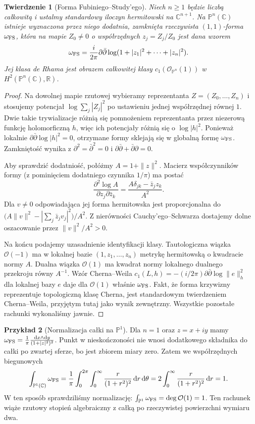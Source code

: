 \documentclass[11pt,a4paper,openany]{report}
\numberwithin{equation}{section}
\theoremstyle{plain}
\newtheorem{twierdzenie}{Twierdzenie}[section]
\theoremstyle{definition}
\newtheorem{przyklad}[twierdzenie]{Przykład}
\theoremstyle{remark}
\newcommand{\R}{\mathbb R}
\newcommand{\C}{\mathbb C}
\newcommand{\PP}{\mathbb P}
\begin{document}
\begin{twierdzenie}[Forma Fubiniego--Study'ego]
\label{tw:ga9-fs}
Niech $n\ge1$ będzie liczbą całkowitą i ustalmy standardowy iloczyn
hermitowski na $\C^{n+1}$. Na $\PP^n(\C)$ istnieje
wyznaczona przez niego dodatnia,
zamknięta rzeczywista $(1,1)$-forma
$\omega_{\rm FS}$, która na mapie $Z_0\ne0$
o współrzędnych $z_j=Z_j/Z_0$ jest dana wzorem
\[
 \omega_{\rm FS}=\frac{i}{2\pi}\partial\bar\partial
 \log(1+|z_1|^2+\cdots+|z_n|^2).
\]
Jej klasa de Rhama jest obrazem całkowitej klasy
$c_1(\mathcal O_{\PP^n}(1))$ w $H^2(\PP^n(\C),\R)$.
\end{twierdzenie}
\begin{proof}
Na dowolnej mapie rzutowej wybieramy reprezentanta
$Z=(Z_0,\ldots,Z_n)$ i stosujemy potencjał
$\log\sum_j|Z_j|^2$ po ustawieniu jednej współrzędnej
równej $1$. Dwie takie trywializacje różnią się
pomnożeniem reprezentanta przez niezerową funkcję
holomorficzną $h$, więc ich potencjały różnią się
o $\log|h|^2$. Ponieważ lokalnie
$\partial\bar\partial\log|h|^2=0$, otrzymane formy
sklejają się w globalną formę $\omega_{\rm FS}$.
Zamkniętość wynika z $\partial^2=\bar\partial^2=0$
i $\partial\bar\partial+\bar\partial\partial=0$.

Aby sprawdzić dodatniość, połóżmy $A=1+\|z\|^2$.
Macierz współczynników formy (z pominięciem dodatniego
czynnika $1/\pi$) ma postać
\[
 \frac{\partial^2\log A}{\partial z_j\partial\bar z_k}
 =\frac{A\delta_{jk}-\bar z_j z_k}{A^2}.
\]
Dla $v\ne0$ odpowiadająca jej forma hermitowska
jest proporcjonalna do
$\big(A\|v\|^2-|\sum_j\bar z_jv_j|^2\big)/A^2$.
Z nierówności Cauchy'ego--Schwarza dostajemy dolne
oszacowanie przez $\|v\|^2/A^2>0$.

Na końcu podajemy uzasadnienie identyfikacji klasy.
Tautologiczna wiązka $\mathcal O(-1)$ ma w lokalnej
bazie $(1,z_1,\ldots,z_n)$ metrykę hermitowską
o kwadracie normy $A$. Dualna wiązka $\mathcal O(1)$
ma kwadrat normy lokalnego dualnego przekroju równy $A^{-1}$.
Wzór Cherna--Weila
$c_1(L,h)=-(i/2\pi)\partial\bar\partial\log\|e\|^2_h$
dla lokalnej bazy $e$ daje dla $\mathcal O(1)$
właśnie $\omega_{\rm FS}$. Fakt, że forma krzywizny
reprezentuje topologiczną klasę Cherna, jest
standardowym twierdzeniem Cherna--Weila, przyjętym
tutaj jako wynik zewnętrzny. Wszystkie pozostałe
rachunki wykonaliśmy jawnie.
\end{proof}

\begin{przyklad}[Normalizacja całki na $\PP^1$]
\label{prz:ga9-fs-integral}
Dla $n=1$ oraz $z=x+iy$ mamy
$\omega_{\rm FS}=\frac1\pi\frac{\mathrm dx\wedge\mathrm dy}
{(1+|z|^2)^2}$. Punkt w nieskończoności nie wnosi
dodatkowego składnika do całki po zwartej sferze,
bo jest zbiorem miary zero. Zatem we współrzędnych
biegunowych
\[
 \int_{\PP^1(\C)}\omega_{\rm FS}
 =\frac1\pi\int_0^{2\pi}\int_0^\infty
 \frac{r}{(1+r^2)^2}\,\mathrm dr\,\mathrm d\theta
 =2\int_0^\infty\frac{r}{(1+r^2)^2}\,\mathrm dr=1.
\]
W ten sposób sprawdziliśmy normalizację:
$\int_{\PP^1}\omega_{\rm FS}=\deg\mathcal O(1)=1$.
Ten rachunek wiąże rzutowy stopień algebraiczny
z całką po rzeczywistej powierzchni wymiaru dwa.
\end{przyklad}
\end{document}
